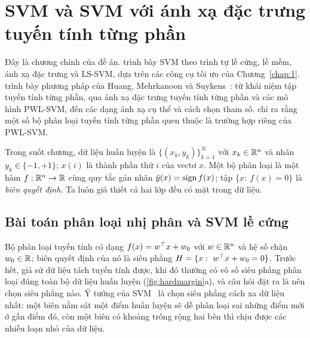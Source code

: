 \chapter{SVM và SVM với ánh xạ đặc trưng tuyến tính từng phần}\label{chap:2}

Đây là chương chính của đề án.  trình bày SVM theo trình tự lề cứng, lề mềm, ánh xạ đặc trưng và LS-SVM, dựa trên các công cụ tối ưu của Chương~\ref{chap:1}.  trình bày phương pháp của Huang, Mehrkanoon và Suykens~\cite{huang2013}: từ khái niệm tập tuyến tính từng phần, qua ánh xạ đặc trưng tuyến tính từng phần và các mô hình PWL-SVM, đến các dạng ánh xạ cụ thể và cách chọn tham số.  chỉ ra rằng một số bộ phân loại tuyến tính từng phần quen thuộc là trường hợp riêng của PWL-SVM.

Trong suốt chương, dữ liệu huấn luyện là $\{(x_k,y_k)\}_{k=1}^{N}$ với $x_k\in\mathbb{R}^n$ và nhãn $y_k\in\{-1,+1\}$; $x(i)$ là thành phần thứ $i$ của vectơ $x$. Một bộ phân loại là một hàm $f:\mathbb{R}^n\to\mathbb{R}$ cùng quy tắc gán nhãn $\hat y(x)=\operatorname{sign} f(x)$; tập $\{x:\ f(x)=0\}$ là \emph{biên quyết định}. Ta luôn giả thiết cả hai lớp đều có mặt trong dữ liệu.

\section{Bài toán phân loại nhị phân và SVM lề cứng}\label{sec:hardmargin}

Bộ phân loại tuyến tính có dạng $f(x)=w^\top x+w_0$ với $w\in\mathbb{R}^n$ và hệ số chặn $w_0\in\mathbb{R}$; biên quyết định của nó là siêu phẳng $H=\{x:\ w^\top x+w_0=0\}$. Trước hết, giả sử dữ liệu tách tuyến tính được, khi đó thường có vô số siêu phẳng phân loại đúng toàn bộ dữ liệu huấn luyện (\cref{fig:hardmargin}a), và câu hỏi đặt ra là nên chọn siêu phẳng nào. Ý tưởng của SVM~\cite{cortes1995,vapnik1998} là chọn siêu phẳng cách xa dữ liệu nhất: một biên nằm sát một điểm huấn luyện sẽ dễ phân loại sai những điểm mới ở gần điểm đó, còn một biên có khoảng trống rộng hai bên thì chịu được các nhiễu loạn nhỏ của dữ liệu.

